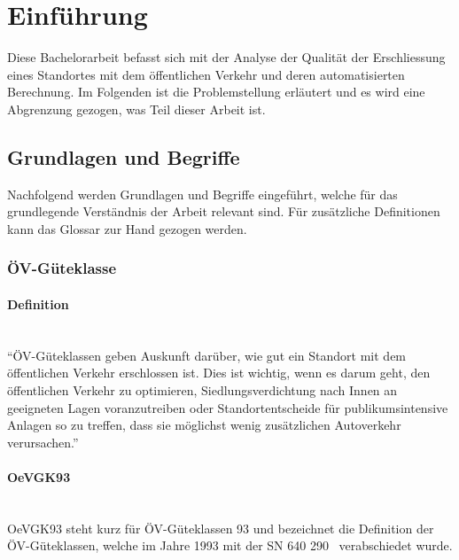 
\section{Einführung}
\label{Einführung}

Diese Bachelorarbeit befasst sich mit der Analyse der Qualität der Erschliessung eines Standortes mit dem öffentlichen Verkehr und deren automatisierten Berechnung.
Im Folgenden ist die Problemstellung erläutert und es wird eine Abgrenzung gezogen, was Teil dieser Arbeit ist.

\subsection{Grundlagen und Begriffe}
\label{Einführung:Grundlagen und Begriffe}

Nachfolgend werden Grundlagen und Begriffe eingeführt, welche für das grundlegende Verständnis der Arbeit relevant sind. Für zusätzliche Definitionen kann das Glossar zur Hand gezogen werden.

\subsubsection{ÖV-Güteklasse}
\label{Grundlagen und Begriffe:ÖV-Güteklasse}

\paragraph{Definition}~\\
"`\acs{ÖV}-Güteklassen geben Auskunft darüber, wie gut ein Standort mit dem öffentlichen Verkehr erschlossen ist.
Dies ist wichtig, wenn es darum geht, den öffentlichen Verkehr zu optimieren, Siedlungsverdichtung nach Innen an geeigneten Lagen voranzutreiben oder Standortentscheide für publikumsintensive Anlagen so zu treffen, dass sie möglichst wenig zusätzlichen Autoverkehr verursachen."'~\cite{oev-guteklasse-gr-defintion}

\paragraph{OeVGK93}~\\
OeVGK93 steht kurz für \acs{ÖV}-Güteklassen 93 und bezeichnet die Definition der \acs{ÖV}-Güteklassen, welche im Jahre 1993 mit der \acs{SN} 640 290~\cite{sn640290} verabschiedet wurde.


